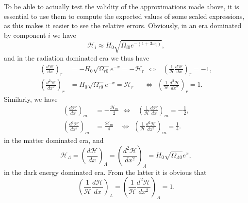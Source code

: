 \documentclass{aa}
\numberwithin{equation}{section}
\numberwithin{table}{section}
\numberwithin{figure}{section}
\begin{document}
To be able to actually test the validity of the approximations made above, it is essential to use them to compute the expected values of some scaled expressions, as this makes it easier to see the relative errors. Obviously, in an era dominated by component $i$ we have
\begin{equation}
    \mathcal{H}_i \approx H_0\sqrt{\Omega_{i0}e^{-(1+3w_i)}},
\end{equation}
and in the radiation dominated era we thus have
\begin{align}
  \left(\frac{d\mathcal{H}}{dx}\right)_r &= -H_0\sqrt{\Omega_{r0}}e^{-x}=-\mathcal{H}_r 
  \hspace{5pt}\Leftrightarrow\hspace{9pt}\left(\frac{1}{\mathcal{H}}\frac{d\mathcal{H}}{dx}\right)_r=-1,
  \\
  \left(\frac{d^2\mathcal{H}}{dx^2}\right)_r &= H_0\sqrt{\Omega_{r0}}e^{-x}=\mathcal{H}_r
  \hspace{18pt}\Leftrightarrow\hspace{5pt}\left(\frac{1}{\mathcal{H}}\frac{d^2\mathcal{H}}{dx^2}\right)_r=1.
\end{align}
Similarly, we have
\begin{align}
  \left(\frac{d\mathcal{H}}{dx}\right)_m &= -\frac{\mathcal{H}_m}{2} 
  \hspace{5pt}\Leftrightarrow\hspace{10pt}\left(\frac{1}{\mathcal{H}}\frac{d\mathcal{H}}{dx}\right)_m=-\frac{1}{2},
  \\
  \left(\frac{d^2\mathcal{H}}{dx^2}\right)_m &= \frac{\mathcal{H}_m}{4}
  \hspace{12pt}\Leftrightarrow\hspace{5pt}\left(\frac{1}{\mathcal{H}}\frac{d^2\mathcal{H}}{dx^2}\right)_m=\frac{1}{4}.
\end{align}
in the matter dominated era, and
\begin{equation}
  \mathcal{H}_\Lambda = \left(\frac{d\mathcal{H}}{dx}\right)_\Lambda = \left(\frac{d^2\mathcal{H}}{dx^2}\right)_\Lambda = H_0\sqrt{\Omega_{\Lambda0}}e^{x},
\end{equation}
in the dark energy dominated era. From the latter it is obvious that
\begin{equation}
  \left(\frac{1}{\mathcal{H}}\frac{d\mathcal{H}}{dx}\right)_\Lambda = \left(\frac{1}{\mathcal{H}}\frac{d^2\mathcal{H}}{dx^2}\right)_\Lambda = 1.
\end{equation} 

\end{document}
